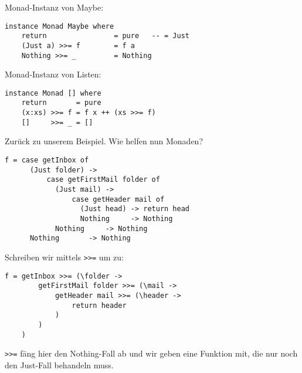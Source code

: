 \documentclass{beamer}
\begin{document}
\begin{frame}[fragile]
Monad-Instanz von Maybe:
\begin{verbatim}
instance Monad Maybe where
    return                = pure   -- = Just
    (Just a) >>= f        = f a
    Nothing >>= _         = Nothing
\end{verbatim}
\begin{comment}
\pause
Monad-Instanz von Either:
\begin{verbatim}
instance Monad Either where
    return                = pure   -- = Right
    (Right e) >>= f       = f e
    (Left e)  >>= _       = Left e
\end{verbatim}
\end{comment}
\pause
Monad-Instanz von Listen:
\begin{verbatim}
instance Monad [] where
    return       = pure
    (x:xs) >>= f = f x ++ (xs >>= f)
    []     >>= _ = []
\end{verbatim}
\end{frame}

\begin{frame}[fragile]
Zurück zu unserem Beispiel. Wie helfen nun Monaden?
\pause
\begin{verbatim}
f = case getInbox of
      (Just folder) -> 
          case getFirstMail folder of
            (Just mail) -> 
                case getHeader mail of
                  (Just head) -> return head
                  Nothing     -> Nothing
            Nothing     -> Nothing
      Nothing       -> Nothing
\end{verbatim}
\end{frame}

\begin{frame}[fragile]
Schreiben wir mittels \texttt{>>=} um zu:
\pause
\begin{verbatim}
f = getInbox >>= (\folder ->
        getFirstMail folder >>= (\mail ->
            getHeader mail >>= (\header ->
                return header
            )
        )
    )
\end{verbatim}
\pause
\texttt{>>=} fäng hier den Nothing-Fall ab und wir geben eine Funktion mit, die nur noch den Just-Fall behandeln muss.
\end{frame}
\end{document}
